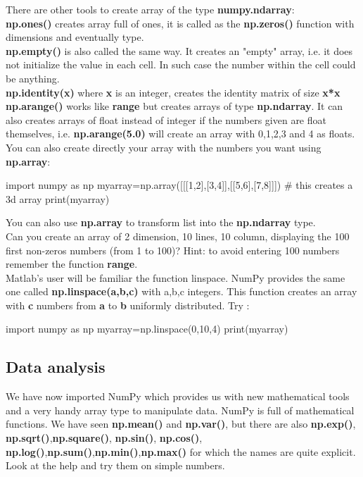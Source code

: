 \documentclass[article,10pt]{scrartcl}
\begin{document}
There are other tools to create array of the type \textbf{numpy.ndarray}:\\
\textbf{np.ones()} creates array full of ones, it is called as the \textbf{np.zeros()} function with dimensions and eventually type.\\
\textbf{np.empty()} is also called the same way. It creates an "empty" array, i.e. it does not initialize the value in each cell. In such case the number within the cell could be anything.\\
\textbf{np.identity(x)} where \textbf{x} is an integer, creates the identity matrix of size \textbf{x*x}
\\
\textbf{np.arange()} works like \textbf{range} but creates arrays of type \textbf{np.ndarray}. It can also creates arrays of float instead of integer if the numbers given are float themselves, i.e. \textbf{np.arange(5.0)} will create an array with 0,1,2,3 and 4 as floats.\\

You can also create directly your array with the numbers you want using \textbf{np.array}:\\
\begin{python}
import numpy as np
myarray=np.array([[[1,2],[3,4]],[[5,6],[7,8]]]) # this creates a 3d array
print(myarray)
\end{python}
You can also use \textbf{np.array} to transform list into the \textbf{np.ndarray} type.\\

Can you create an array of 2 dimension, 10 lines, 10 column, displaying the 100 first non-zeros numbers (from 1 to 100)? Hint: to avoid entering 100 numbers remember the function \textbf{range}.\\


Matlab's user will be familiar the function linspace. NumPy provides the same one called \textbf{np.linspace(a,b,c)} with a,b,c integers. This function creates an array with \textbf{c} numbers from \textbf{a} to \textbf{b} uniformly distributed.
Try :
\begin{python}
import numpy as np
myarray=np.linspace(0,10,4)
print(myarray)
\end{python}

\subsection*{Data analysis}
We have now imported NumPy which provides us with new mathematical tools and a very handy array type to manipulate data. NumPy is full of mathematical functions. We have seen \textbf{np.mean()} and \textbf{np.var()}, but there are also \textbf{np.exp()}, \textbf{np.sqrt()},\textbf{np.square()}, \textbf{np.sin()}, \textbf{np.cos()}, \textbf{np.log()},\textbf{np.sum()},\textbf{np.min()},\textbf{np.max()} for which the names are quite explicit. Look at the help and try them on simple numbers.
\\
\end{document}
